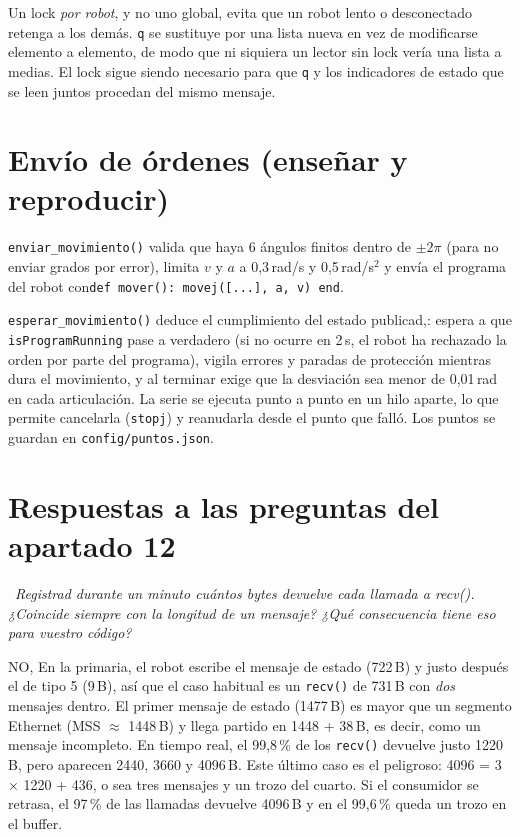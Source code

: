\documentclass[10pt,a4paper]{article}
\newcommand{\code}[1]{\texttt{\small #1}}
\newcommand{\preg}[2]{\par\smallskip\noindent{\color{azul}\bfseries P#1.}~{\itshape #2}\par\nopagebreak}
\begin{document}
Un lock \emph{por robot}, y no uno global, evita que un robot lento o desconectado retenga a los demás. \code{q} se sustituye por una lista nueva en vez de modificarse elemento a elemento, de modo que ni siquiera un lector sin lock vería una lista a medias. El lock sigue siendo necesario para que \code{q} y los indicadores de estado que se leen juntos procedan del mismo mensaje.

\section{Envío de órdenes (enseñar y reproducir)}

\code{enviar\_movimiento()} valida que haya 6 ángulos finitos dentro de $\pm2\pi$ (para no enviar grados por error), limita $v$ y $a$ a 0,3\,rad/s y 0,5\,rad/s$^2$ y envía el programa del robot con\code{def mover(): movej([...], a, v) end}.

\code{esperar\_movimiento()} deduce el cumplimiento del estado publicad,: espera a que \code{isProgramRunning} pase a verdadero (si no ocurre en 2\,s, el robot ha rechazado la orden por parte del programa), vigila errores y paradas de protección mientras dura el movimiento, y al terminar exige que la desviación sea menor de 0,01\,rad en cada articulación. La serie se ejecuta punto a punto en un hilo aparte, lo que permite cancelarla (\code{stopj}) y reanudarla desde el punto que falló. Los puntos se guardan en \code{config/puntos.json}.

\section{Respuestas a las preguntas del apartado 12}

\preg{1}{Registrad durante un minuto cuántos bytes devuelve cada llamada a recv(). ¿Coincide
siempre con la longitud de un mensaje? ¿Qué consecuencia tiene eso para vuestro
código?}\label{sec:p1}
NO, En la primaria, el robot escribe el mensaje de estado (722\,B) y justo después el de tipo 5 (9\,B), así que el caso habitual es un \code{recv()} de 731\,B con \emph{dos} mensajes dentro. El primer mensaje de estado (1477\,B) es mayor que un segmento Ethernet (MSS $\approx$ 1448\,B) y llega partido en 1448 + 38\,B, es decir, como un mensaje incompleto. En tiempo real, el 99,8\,\% de los \code{recv()} devuelve justo 1220\,B, pero aparecen 2440, 3660 y 4096\,B. Este último caso es el peligroso: 4096 = 3 × 1220 + 436, o sea tres mensajes y un trozo del cuarto. Si el consumidor se retrasa, el 97\,\% de las llamadas devuelve 4096\,B y en el 99,6\,\% queda un trozo en el buffer.
\end{document}
